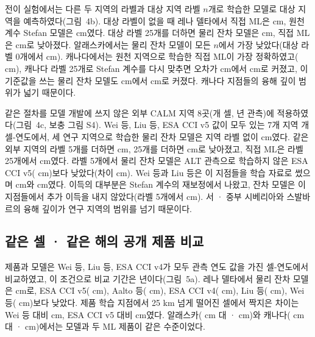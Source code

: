 전이 실험에서는 다른 두 지역의 라벨과 대상 지역 라벨 $n$개로 학습한 모델로 대상 지역을 예측하였다(그림~4b). 대상 라벨이 없을 때 레나 델타에서 직접 ML은 \ntlrmseLeDszero{} cm, 원천 계수 Stefan 모델은 \ntlrmseLePzzero{} cm였다. 대상 라벨 25개를 더하면 물리 잔차 모델은 \ntlrmseLeRstwfive{} cm, 직접 ML은 \ntlrmseLeDstwfive{} cm로 낮아졌다. 알래스카에서는 물리 잔차 모델이 모든 $n$에서 가장 낮았다(대상 라벨 0개에서 \ntlrmseAkRszero{} cm). 캐나다에서는 원천 지역으로 학습한 직접 ML이 가장 정확하였고(\ntlrmseCaDszero{} cm), 캐나다 라벨 25개로 Stefan 계수를 다시 맞추면 오차가 \ntlrmseCaPzzero{} cm에서 \ntlrmseCaPntwfive{} cm로 커졌고, 이 기준값을 쓰는 물리 잔차 모델도 \ntlrmseCaRszero{} cm에서 \ntlrmseCaRstwfive{} cm로 커졌다. 캐나다 지점들의 융해 깊이 범위가 넓기 때문이다.

같은 절차를 모델 개발에 쓰지 않은 외부 CALM 지역 8곳(\nextcells{}개 셀, \nyrsext{}년 관측)에 적용하였다(그림~4c, 보충 그림 S4). Wei 등, Liu 등, ESA CCI v5 값이 모두 있는 7개 지역 \nftrows{}개 셀-연도에서, 세 연구 지역으로 학습한 물리 잔차 모델은 지역 라벨 없이 \nftAllRszero{} cm였다. 같은 외부 지역의 라벨 5개를 더하면 \nftAllRsfive{} cm, 25개를 더하면 \nftAllRstwfive{} cm로 낮아졌고, 직접 ML은 라벨 25개에서 \nftAllDstwfive{} cm였다. 라벨 5개에서 물리 잔차 모델은 ALT 관측으로 학습하지 않은 ESA CCI v5(\nftAllCcifivezero{} cm)보다 낮았다(차이 \nftdRsCcifivefive{} cm). Wei 등과 Liu 등은 이 지점들을 학습 자료로 썼으며 \nftAllWeizero{} cm와 \nftAllLiuzero{} cm였다. 이득의 대부분은 Stefan 계수의 재보정에서 나왔고, 잔차 모델은 이 지점들에서 추가 이득을 내지 않았다(라벨 5개에서 \nftdRsPnfive{} cm). 서 · 중부 시베리아와 스발바르의 융해 깊이가 연구 지역의 범위를 넘기 때문이다.

\subsection{같은 셀 · 같은 해의 공개 제품 비교}
제품과 모델은 Wei 등, Liu 등, ESA CCI v4가 모두 관측 연도 값을 가진 셀-연도에서 비교하였고, 이 조건으로 비교 기간은 \nyrscc{}년이다(그림~5a). 레나 델타에서 물리 잔차 모델은 \nccLeRoall{} cm로, ESA CCI v5(\nccLeCcifiveall{} cm), Aalto 등(\nccLeAaltoall{} cm), ESA CCI v4(\nccLeCcifourall{} cm), Liu 등(\nccLeLiuall{} cm), Wei 등(\nccLeWeiall{} cm)보다 낮았다. 제품 학습 지점에서 25 km 넘게 떨어진 셀에서 짝지은 차이는 Wei 등 대비 \ndprodLeweiRomask{} cm, ESA CCI v5 대비 \ndprodLeccifiveRomask{} cm였다. 알래스카(\nccAkRoall{} cm 대 \nccAkWeiall{} · \nccAkLiuall{} cm)와 캐나다(\nccCaRoall{} cm 대 \nccCaWeiall{} · \nccCaLiuall{} cm)에서는 모델과 두 ML 제품이 같은 수준이었다.

